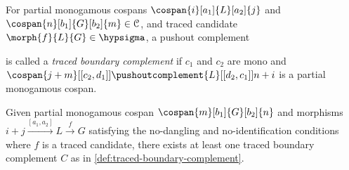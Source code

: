 \begin{definition}
    \label{def:traced-boundary-complement}
    For partial monogamous cospans \(
        \cospan{i}[a_1]{L}[a_2]{j}
    \) and \(
        \cospan{n}[b_1]{G}[b_2]{m} \in \mathcal{C}
    \), and traced candidate \(
        \morph{f}{L}{G} \in \hypsigma
    \), a pushout complement
    \begin{center}
        
    \end{center}
    is called a \emph{traced boundary complement} if \(c_1\) and \(c_2\) are
    mono and \(
        \cospan{j+m}[[c_2,d_1]]{\pushoutcomplement{L}}[[d_2,c_1]]{{n+i}}
    \) is a partial monogamous cospan.
\end{definition}

\begin{lemma}
    \label{lem:traced-boundary-complement-exists}
    Given partial monogamous cospan \(\cospan{m}[b_1]{G}[b_2]{n}\) and morphisms
    \(
        i + j \xrightarrow{[a_1, a_2]} L \xrightarrow{f} G
    \) satisfying the no-dangling and no-identification conditions where \(f\)
    is a traced candidate, there exists at least one traced boundary complement
    \(C\) as in \cref{def:traced-boundary-complement}.
\end{lemma}
